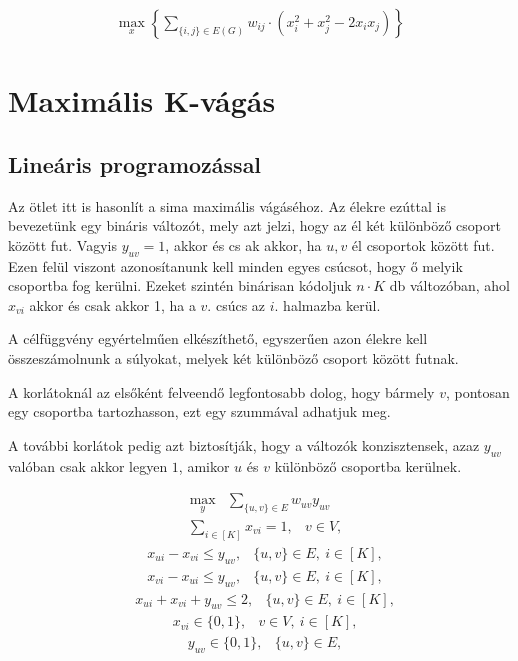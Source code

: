 \begin{align}
	\max_{x} \left\{ \sum_{\{i,j\} \in E(G)}{w_{ij} \cdot (x_i^2+x_j^2-2 x_i x_j)}\right\}
\end{align}


\section{Maximális K-vágás}


\subsection{Lineáris programozással}

Az ötlet itt is hasonlít a sima maximális vágáséhoz. Az élekre ezúttal is bevezetünk egy bináris változót, mely azt jelzi, hogy az él két különböző csoport között fut. Vagyis $y_{uv}=1$, akkor és cs
ak akkor, ha $u, v$ él csoportok között fut. Ezen felül viszont azonosítanunk kell minden egyes csúcsot, hogy ő melyik csoportba fog kerülni. Ezeket szintén binárisan kódoljuk $n \cdot K$ db változóban, ahol $x_{vi}$ akkor és csak akkor 1, ha a $v.$ csúcs az $i.$ halmazba kerül. 

A célfüggvény egyértelműen elkészíthető, egyszerűen azon élekre kell összeszámolnunk a súlyokat, melyek két különböző csoport között futnak.

A korlátoknál az elsőként felveendő legfontosabb dolog, hogy bármely $v$, pontosan egy csoportba tartozhasson, ezt egy szummával adhatjuk meg.

A további korlátok pedig azt biztosítják, hogy a változók konzisztensek, azaz  $y_{uv}$ valóban csak akkor legyen $1$, amikor  $u$ és $v$ különböző csoportba kerülnek.

\begin{align} \max _{y} &\sum _{\{{u,v}\} \in E} w_{uv}y_{uv} \end{align}
\begin{align} &\sum _{i \in [K]} x_{vi} = 1,&v \in V, \end{align}
\begin{align}&x_{ui} - x_{vi} \le y_{uv},&\{{u,v}\} \in E, \ i\in [K],\end{align}
\begin{align}&x_{vi} - x_{ui} \le y_{uv},&\{{u,v}\} \in E, \ i\in [K], \end{align}
\begin{align}&x_{ui} + x_{vi} + y_{uv} \le 2,&\{{u,v}\} \in E, \ i\in [K],\end{align}
\begin{align}&x_{vi} \in \{{0,1}\} ,&v \in V, \ i\in [K],\end{align}
\begin{align}&y_{uv} \in \{{0,1}\} ,&\{{u,v}\} \in E,\end{align}

